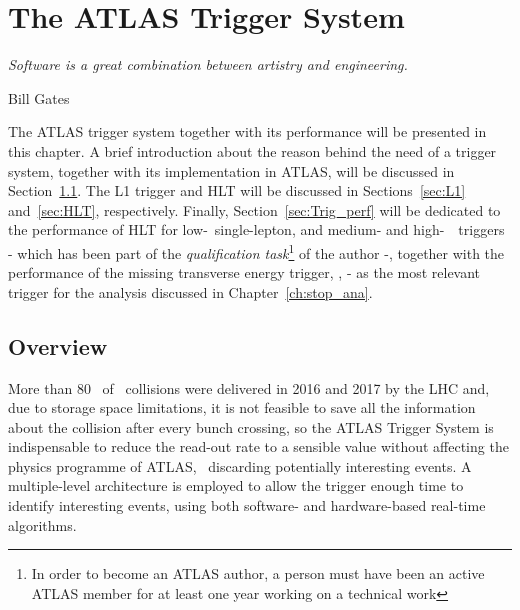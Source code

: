 \chapter{The ATLAS Trigger System}
\label{ch:trigger}
\epigraph{\emph{Software is a great combination between artistry and engineering.}}{Bill Gates}

	The \ac{ATLAS} trigger system together with its performance will be presented in this chapter. A brief introduction about the reason behind the need of a trigger system, together with its implementation in \ac{ATLAS}, will be discussed in Section~\ref{sec:Trig_intro}. The \ac{L1} trigger and \ac{HLT} will be discussed in Sections~\ref{sec:L1} and~\ref{sec:HLT}, respectively. Finally, Section~\ref{sec:Trig_perf} will be dedicated to the performance of \ac{HLT} for low-\pt\ single-lepton, and medium- and high-\pt\ \bj\ triggers - which has been part of the \textit{qualification task}\footnote{In order to become an \ac{ATLAS} author, a person must have been an active \ac{ATLAS} member for at least one year working on a technical work} of the author -, together with the performance of the missing transverse energy trigger, \met, - as the most relevant trigger for the analysis discussed in Chapter~\ref{ch:stop_ana}.



	\section{Overview}
	\label{sec:Trig_intro}

		More than 80 \ifb\ of \pp\ collisions were delivered in 2016 and 2017 by the \ac{LHC} and, due to storage space limitations, it is not feasible to save all the information about the collision after every bunch crossing, so the \ac{ATLAS} Trigger System is indispensable to reduce the read-out rate to a sensible value without affecting the physics programme of \ac{ATLAS}, \eg\ discarding potentially interesting events. A multiple-level architecture is employed to allow the trigger enough time to identify interesting events, using both software- and hardware-based real-time algorithms. 

